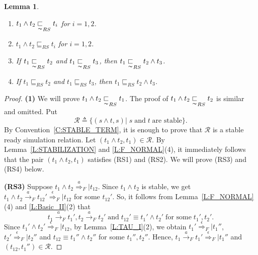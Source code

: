 \documentclass{elsarticle}
\theoremstyle{plain}
\newtheorem{lemma}[theorem]{Lemma}
\theoremstyle{definition}
\begin{document}
\begin{lemma}\label{L:CON_ID_I}\hfill
     \begin{enumerate}
      \item $t_1  \wedge t_2 \underset{\thicksim}{\sqsubset}_{RS} t_i$ for $i=1,2$.
      \item $t_1 \wedge t_2 \sqsubseteq_{RS} t_i$ for $i=1,2$.
      \item If $t_1 \underset{\thicksim}{\sqsubset}_{RS} t_2 $ and $t_1 \underset{\thicksim}{\sqsubset}_{RS} t_3$, then $t_1  \underset{\thicksim}{\sqsubset}_{RS} t_2 \wedge t_3$.
      \item If $t_1 \sqsubseteq_{RS} t_2 $ and $t_1 \sqsubseteq_{RS} t_3$, then $t_1  \sqsubseteq_{RS} t_2 \wedge t_3$.
    \end{enumerate}
\end{lemma}
\begin{proof}
\textbf{(1)} We will prove $t_1  \wedge t_2 \underset{\thicksim}{\sqsubset}_{RS} t_1$. The proof of $t_1  \wedge t_2 \underset{\thicksim}{\sqsubset}_{RS} t_2$ is similar and omitted.
    Put
     \[ {\mathcal R}\triangleq\{(s \wedge t , s)| \;s\;\text{and}\;t \;\text{are stable}\}.\]
     By Convention~\ref{C:STABLE_TERM}, it is enough to prove that $\mathcal R$ is a stable ready simulation relation. Let $(t_1 \wedge t_2 , t_1) \in {\mathcal R}$.
    By Lemma~\ref{L:STABILIZATION} and \ref{L:F_NORMAL}(4), it immediately follows that the pair $(t_1 \wedge t_2 , t_1)$ satisfies (RS1) and (RS2). We will prove (RS3) and (RS4) below.

    \textbf{(RS3)} Suppose $t_1 \wedge t_2 \stackrel{a}{\Longrightarrow}_F| t_{12}$. Since $t_1 \wedge t_2$ is stable, we get $t_1 \wedge t_2 \stackrel{a}{\longrightarrow}_F t_{12}' \stackrel{\epsilon}{\Longrightarrow}_F|t_{12}$ for some $t_{12}'$.
    So, it follows from Lemma~\ref{L:F_NORMAL}(4) and \ref{L:Basic_II}(2) that
    \[t_1  \stackrel{a}{\longrightarrow}_F t_1', t_2 \stackrel{a}{\longrightarrow}_F  t_2'\;\text{and}\; t_{12}' \equiv t_1' \wedge t_2'\;\text{for some}\;t_1',t_2'.\]
    Since $t_1' \wedge t_2' \stackrel{\epsilon}{\Longrightarrow}_F|t_{12}$, by Lemma~\ref{L:TAU_I}(2), we obtain $t_1' \stackrel{\epsilon}{\Longrightarrow}_F|t_1''$, $t_2' \stackrel{\epsilon}{\Longrightarrow}_F|t_2''$ and  $t_{12} \equiv t_1'' \wedge t_2''$ for some $t_1'',t_2''$. Hence, $t_1 \stackrel{a}{\longrightarrow}_F t_1' \stackrel{\epsilon}{\Longrightarrow}_F|t_1''$ and $(t_{12},t_1'') \in {\mathcal R}$.


\end{proof}
\end{document}
